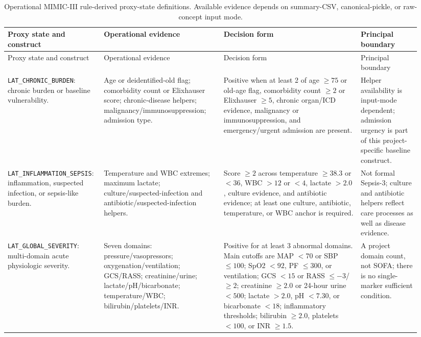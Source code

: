 \begin{landscape}
\begingroup
\small
\singlespacing
\sloppy
\setlength{\tabcolsep}{3pt}
\begin{longtable}{@{}L{0.19\linewidth}L{0.29\linewidth}L{0.32\linewidth}L{0.14\linewidth}@{}}
\caption{Operational MIMIC-III rule-derived proxy-state definitions.  Available evidence depends on summary-CSV, canonical-pickle, or raw-concept input mode.}
\label{tab:mimic-proxy-definitions}\\
\toprule
Proxy state and construct & Operational evidence & Decision form & Principal boundary \\
\midrule
\endfirsthead
\toprule
Proxy state and construct & Operational evidence & Decision form & Principal boundary \\
\midrule
\endhead
\bottomrule
\endfoot
\nolinkurl{LAT_CHRONIC_BURDEN}: chronic burden or baseline vulnerability. & Age or deidentified-old flag; comorbidity count or Elixhauser score; chronic-disease helpers; malignancy/immunosuppression; admission type. & Positive when at least 2 of age $\ge 75$ or old-age flag, comorbidity count $\ge 2$ or Elixhauser $\ge 5$, chronic organ/ICD evidence, malignancy or immunosuppression, and emergency/urgent admission are present. & Helper availability is input-mode dependent; admission urgency is part of this project-specific baseline construct. \\
\nolinkurl{LAT_INFLAMMATION_SEPSIS}: inflammation, suspected infection, or sepsis-like burden. & Temperature and WBC extremes; maximum lactate; culture/suspected-infection and antibiotic/suspected-infection helpers. & Score $\ge 2$ across temperature $\ge 38.3$ or $<36$, WBC $>12$ or $<4$, lactate $>2.0$, culture evidence, and antibiotic evidence; at least one culture, antibiotic, temperature, or WBC anchor is required. & Not formal Sepsis-3; culture and antibiotic helpers reflect care processes as well as disease evidence. \\
\nolinkurl{LAT_GLOBAL_SEVERITY}: multi-domain acute physiologic severity. & Seven domains: pressure/vasopressors; oxygenation/ventilation; GCS/RASS; creatinine/urine; lactate/pH/bicarbonate; temperature/WBC; bilirubin/platelets/INR. & Positive for at least 3 abnormal domains.  Main cutoffs are MAP $<70$ or SBP $\le 100$; SpO2 $<92$, PF $\le 300$, or ventilation; GCS $<15$ or RASS $\le -3$/$\ge 2$; creatinine $\ge 2.0$ or 24-hour urine $<500$; lactate $>2.0$, pH $<7.30$, or bicarbonate $<18$; inflammatory thresholds; bilirubin $\ge 2.0$, platelets $<100$, or INR $\ge 1.5$. & A project domain count, not SOFA; there is no single-marker sufficient condition. \\

\end{longtable}
\end{landscape}
